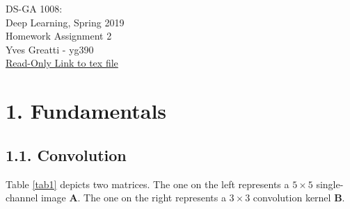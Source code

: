\documentclass[11pt]{article}
\newcommand{\0}{\mat{0}}
\newcommand{\matr}[1]{\bm{#1}}     %
\begin{document}
\noindent DS-GA 1008:\\
Deep Learning, Spring 2019\\
Homework Assignment 2 \\
Yves Greatti - yg390\\
\href{https://www.overleaf.com/project/5c7316d634ff9f6576d02da0}{Read-Only Link to tex file}


\section*{1. Fundamentals}
\subsection*{1.1. Convolution}
Table \ref{tab1} depicts two matrices. The one on the left represents a $5\times 5$ single-channel image $\matr{A}$. The one on the right
 represents a $3\times 3$ convolution kernel $\matr{B}$. 
\end{document}
